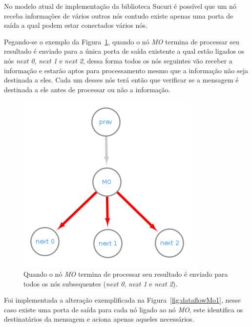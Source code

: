 No modelo atual de implementação da biblioteca Sucuri é possível que um nó receba informações de vários outros nós contudo existe apenas uma porta de saída a qual podem estar conectados vários nós.

Pegando-se o exemplo da Figura~\ref{fig:dataflowMo3}, quando o nó \textit{MO} termina de processar seu resultado é enviado para a única porta de saída existente a qual estão ligados os nós \textit{next 0}, \textit{next 1} e \textit{next 2}, dessa forma todos os nós seguintes vão receber a informação e estarão aptos para processamento mesmo que a informação não seja destinada a eles.
Cada um desses nós terá então que verificar se a mensagem é destinada a ele antes de processar ou não a informação.

\begin{figure}[htbp]
    \centerline{\includegraphics[scale=0.6]{figuras/dataflow/multi_output3.png}}
    \caption{Quando o nó \textit{MO} termina de processar seu resultado é enviado para todos os nós subsequentes (\textit{next 0}, \textit{next 1} e \textit{next 2}).}
    \label{fig:dataflowMo3}
\end{figure}

Foi implementada a alteração exemplificada na Figura~\ref{fig:dataflowMo1}, nesse caso existe uma porta de saída para cada nó ligado ao nó \textit{MO}, este identifica os destinatários da mensagem e aciona apenas aqueles necessários.

